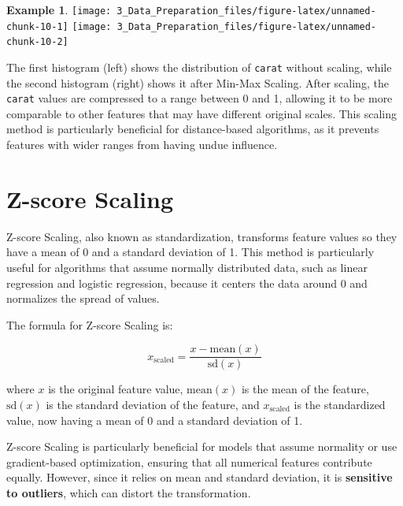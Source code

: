 \documentclass[
  11pt,
]{book}
\theoremstyle{definition}
\theoremstyle{definition}
\newtheorem{example}{Example}[chapter]
\theoremstyle{definition}
\theoremstyle{definition}
\theoremstyle{remark}
\begin{document}
\begin{example}
\texttt{[image: 3\_Data\_Preparation\_files/figure-latex/unnamed-chunk-10-1]} \texttt{[image: 3\_Data\_Preparation\_files/figure-latex/unnamed-chunk-10-2]}

The first histogram (left) shows the distribution of \texttt{carat} without scaling, while the second histogram (right) shows it after Min-Max Scaling. After scaling, the \texttt{carat} values are compressed to a range between 0 and 1, allowing it to be more comparable to other features that may have different original scales. This scaling method is particularly beneficial for distance-based algorithms, as it prevents features with wider ranges from having undue influence.
\end{example}

\section{Z-score Scaling}\label{z-score-scaling}

Z-score Scaling, also known as standardization, transforms feature values so they have a mean of 0 and a standard deviation of 1. This method is particularly useful for algorithms that assume normally distributed data, such as linear regression and logistic regression, because it centers the data around 0 and normalizes the spread of values.

The formula for Z-score Scaling is:

\[
x_{\text{scaled}} = \frac{x - \text{mean}(x)}{\text{sd}(x)}
\]

where \(x\) is the original feature value, \(\text{mean}(x)\) is the mean of the feature, \(\text{sd}(x)\) is the standard deviation of the feature, and \(x_{\text{scaled}}\) is the standardized value, now having a mean of 0 and a standard deviation of 1.

Z-score Scaling is particularly beneficial for models that assume normality or use gradient-based optimization, ensuring that all numerical features contribute equally. However, since it relies on mean and standard deviation, it is \textbf{sensitive to outliers}, which can distort the transformation.
\end{document}
